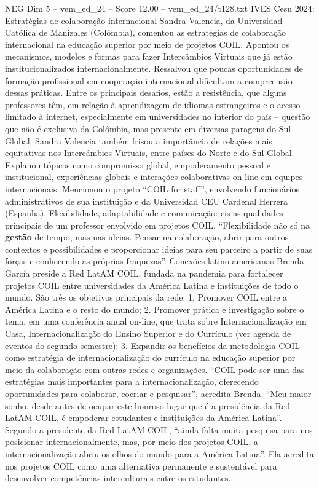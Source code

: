 \begin{textsample}{NEG Dim 5 – vem\_ed\_24 – Score 12.00 – vem\_ed\_24/t128.txt}  \label{ex:f5_neg_154}
IVES Cesu 2024: Estratégias de colaboração internacional Sandra Valencia, da Universidad Católica de Manizales (Colômbia), comentou as estratégias de colaboração internacional na educação superior por meio de projetos COIL.
Apontou os mecanismos, modelos e formas para fazer Intercâmbios Virtuais que já estão institucionalizados internacionalmente.
Ressalvou que poucas oportunidades de formação profissional em cooperação internacional dificultam a compreensão dessas práticas.
Entre os principais desafios, estão a resistência, que alguns professores têm, em relação à aprendizagem de idiomas estrangeiros e o acesso limitado à internet, especialmente em universidades no interior do país – questão que não é exclusiva da Colômbia, mas presente em diversas paragens do Sul Global.
Sandra Valencia também frisou a importância de relações mais equitativas nos Intercâmbios Virtuais, entre países do Norte e do Sul Global.
Explanou tópicos como compromisso global, empoderamento pessoal e institucional, experiências globais e interações colaborativas on-line em equipes internacionais.
Mencionou o projeto “COIL for staff”, envolvendo funcionários administrativos de sua instituição e da Universidad CEU Cardenal Herrera (Espanha).
Flexibilidade, adaptabilidade e comunicação: eis as qualidades principais de um professor envolvido em projetos COIL. “Flexibilidade não só na \textbf{gestão} de tempo, mas nas ideias.
Pensar na colaboração, abrir para outros contextos e possibilidades e proporcionar ideias para seu parceiro a partir de suas forças e conhecendo as próprias fraquezas”.
Conexões latino-americanas Brenda García preside a Red LatAM COIL, fundada na pandemia para fortalecer projetos COIL entre universidades da América Latina e instituições de todo o mundo.
São três os objetivos principais da rede: 1.
Promover COIL entre a América Latina e o resto do mundo; 2.
Promover prática e investigação sobre o tema, em uma conferência anual on-line, que trata sobre Internacionalização em Casa, Internacionalização do Ensino Superior e do Currículo (ver agenda de eventos do segundo semestre); 3.
Expandir os benefícios da metodologia COIL como estratégia de internacionalização do currículo na educação superior por meio da colaboração com outras redes e organizações. “COIL pode ser uma das estratégias mais importantes para a internacionalização, oferecendo oportunidades para colaborar, cocriar e pesquisar”, acredita Brenda. “Meu maior sonho, desde antes de ocupar este honroso lugar que é a presidência da Red LatAM COIL, é empoderar estudantes e instituições da América Latina”.
Segundo a presidente da Red LatAM COIL, “ainda falta muita pesquisa para nos posicionar internacionalmente, mas, por meio dos projetos COIL, a internacionalização abriu os olhos do mundo para a América Latina”.
Ela acredita nos projetos COIL como uma alternativa permanente e sustentável para desenvolver competências interculturais entre os estudantes.

\end{textsample}
